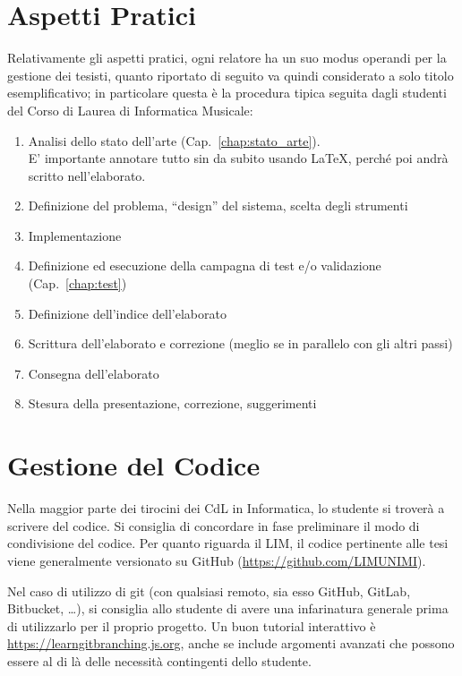 \section{Aspetti Pratici}
Relativamente gli aspetti pratici, ogni relatore ha un suo modus operandi per la gestione dei tesisti, quanto riportato di seguito va quindi considerato a solo titolo esemplificativo; in particolare questa è la procedura tipica seguita dagli studenti del Corso di Laurea di Informatica Musicale:
\begin{enumerate}
    \item Analisi dello stato dell'arte (Cap.~\ref{chap:stato_arte}).\\E' importante annotare tutto sin da subito usando \LaTeX, perché poi andrà scritto nell'elaborato.
    \item Definizione del problema, ``design'' del sistema, scelta degli strumenti
    \item Implementazione
    \item Definizione ed esecuzione della campagna di test e/o validazione (Cap.~\ref{chap:test})
    \item Definizione dell'indice dell'elaborato
    \item Scrittura dell'elaborato e correzione (meglio se in parallelo con gli altri passi)
    \item Consegna dell'elaborato
    \item Stesura della presentazione, correzione, suggerimenti
\end{enumerate}

\section{Gestione del Codice}
Nella maggior parte dei tirocini dei CdL in Informatica, lo studente si troverà a scrivere del codice. Si consiglia di concordare in fase preliminare il modo di condivisione del codice.
Per quanto riguarda il LIM, il codice pertinente alle tesi viene generalmente versionato su GitHub (\url{https://github.com/LIMUNIMI}).

Nel caso di utilizzo di git (con qualsiasi remoto, sia esso GitHub, GitLab, Bitbucket, \dots), si consiglia allo studente di avere una infarinatura generale prima di utilizzarlo per il proprio progetto. Un buon tutorial interattivo è \url{https://learngitbranching.js.org}, anche se include argomenti avanzati che possono essere al di là delle necessità contingenti dello studente.
